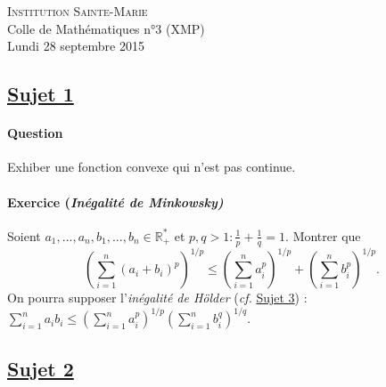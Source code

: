 \documentclass[12pt,a4paper]{report}
\begin{document}
\newcommand{\rA}{\mathcal{A}}
\newcommand{\rB}{\mathcal{B}}
\newcommand{\rC}{\mathcal{C}}
\newcommand{\rG}{\mathcal{G}}
\newcommand{\rF}{\mathcal{F}}
\newcommand{\rP}{\mathcal{P}}
\newcommand{\rH}{\mathcal{H}}
\newcommand{\rR}{\mathcal{R}}
\newcommand{\rE}{\mathcal{E}}
\newcommand{\rL}{\mathcal{L}}
\newcommand{\rM}{\mathcal{M}}
\newcommand{\bK}{\mathbb{K}}
\newcommand{\bQ}{\mathbb{Q}}
\newcommand{\bR}{\mathbb{R}}
\newcommand{\bZ}{\mathbb{Z}}
\newcommand{\bN}{\mathbb{N}}
\newcommand{\bC}{\mathbb{C}}
\newcommand{\bP}{\mathbb{P}}
\newcommand{\bF}{\mathbb{F}}

\ifpdf
{}
\else
{}
\fi

\pagestyle{empty} %

\noindent \textsc{Institution Sainte-Marie}\\
Colle de Mathématiques n°3 (XMP)\\
Lundi 28 septembre 2015


\subsection*{\underline{Sujet 1}}

\paragraph*{Question} %

Exhiber une fonction convexe qui n'est pas continue.

\paragraph*{Exercice (\emph{Inégalité de Minkowsky)}} %

Soient $a_1, ..., a_n, b_1, ..., b_n \in \bR_+^*$ et $p,q>1:\frac{1}{p}+\frac{1}{q}=1$. Montrer que 
$$\left(\sum\limits_{i=1}^n(a_i+b_i)^p\right)^{1/p}\leq\left(\sum\limits_{i=1}^na_i^p\right)^{1/p}+\left(\sum\limits_{i=1}^nb_i^p\right)^{1/p}.$$
On pourra supposer l'\emph{inégalité de Hölder} (\emph{cf.} \uline{Sujet 3}) : $\sum\limits_{i=1}^na_ib_i\leq\left(\sum\limits_{i=1}^na_i^p\right)^{1/p}\left(\sum\limits_{i=1}^nb_i^q\right)^{1/q}.$

\subsection*{\underline{Sujet 2}} %
\end{document}
